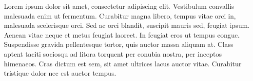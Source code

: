\begin{preface}
Lorem ipsum dolor sit amet, consectetur adipiscing elit. Vestibulum convallis malesuada enim ut fermentum. Curabitur magna libero, tempus vitae orci in, malesuada scelerisque orci. Sed ac orci blandit, suscipit mauris sed, feugiat ipsum. Aenean vitae neque et metus feugiat laoreet. In feugiat eros ut tempus congue. Suspendisse gravida pellentesque tortor, quis auctor massa aliquam at. Class aptent taciti sociosqu ad litora torquent per conubia nostra, per inceptos himenaeos. Cras dictum est sem, sit amet ultrices lacus auctor vitae. Curabitur tristique dolor nec est auctor tempus.
\end{preface}


